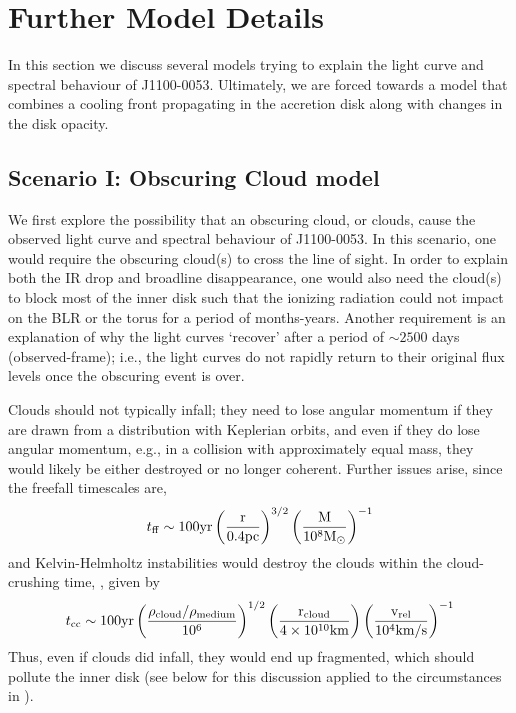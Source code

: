 \documentclass[11pt,a4paper]{article}
\begin{document}
\section*{Further Model Details}
In this section we discuss several models trying to explain the light
curve and spectral behaviour of J1100-0053. Ultimately, we are forced
towards a model that combines a cooling front propagating in the
accretion disk along with changes in the disk opacity.

\subsection*{Scenario I: Obscuring Cloud model}
We first explore the possibility that an obscuring cloud, or clouds,
cause the observed light curve and spectral behaviour of J1100-0053.  In
this scenario, one would require the obscuring cloud(s) to cross the
line of sight. In order to explain both the IR drop and broadline
disappearance, one would also need the cloud(s) to block most of the
inner disk such that the ionizing radiation could not impact on the
BLR or the torus for a period of months-years.  Another requirement
is an explanation of why the light curves `recover' after a period of
$\sim 2500$ days (observed-frame); i.e., the light curves do not
rapidly return to their original flux levels once the obscuring event
is over.

Clouds should not typically infall; they need to lose angular momentum
if they are drawn from a distribution with Keplerian orbits, and even
if they do lose angular momentum, e.g., in a collision with
approximately equal mass, they would likely be either destroyed or no
longer coherent. Further issues 
arise, since the freefall timescales
are,
\begin{equation}
    t_{{\rm ff}}   \sim 100   \rm{yr}  \left(\frac{r}{0.4\rm{pc}}\right)^{3/2} 
                                            \left(\frac{M}{10^{8}M_{\odot}}\right)^{-1}
\end{equation}
and Kelvin-Helmholtz instabilities would destroy the clouds within the
cloud-crushing time, \citep[e.g., ][]{Nagakura2008, Hopkins2013,
Shiokawa2015, Bae2016},
given by
\begin{equation}
    t_{\rm cc} \sim 100\rm{yr} \left(\frac{\rho_{cloud}/\rho_{medium}}{10^{6}}\right)^{1/2} 
                                            \left(\frac{r_{\rm cloud}}{4 \times 10^{10}\rm{km}}\right) 
                                            \left(\frac{v_{\rm rel}}{10^{4}\rm{km/s}}\right)^{-1}
\end{equation}
Thus, even if clouds did infall, they would end up fragmented, which
should pollute the inner disk (see below for this discussion applied
to the circumstances in \citet{Guo2016}).
\end{document}
